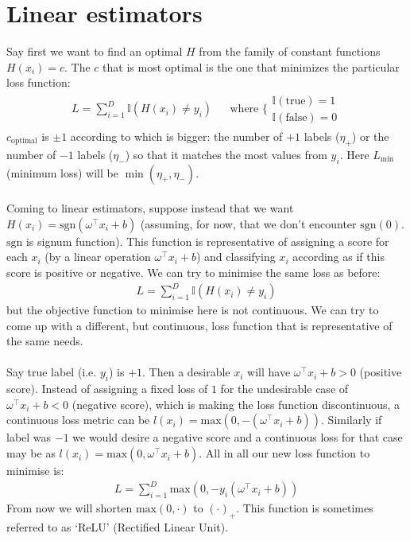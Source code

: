 \documentclass[12pt]{article}
\begin{document}
\section{Linear estimators}
Say first we want to find an optimal $H$ from the family of constant functions $H(x_i) = c$. The $c$ that is most optimal is the one that minimizes the particular loss function:
\begin{align}
    L = \sum_{i=1}^{D}\mathbb{I}\left(H(x_i) \neq y_i\right) && \textrm{where } \bigg\{ \substack{\mathbb{I}(\textrm{true}) = 1 \\ \mathbb{I}(\textrm{false}) = 0}
\end{align}
$c_{\textrm{optimal}}$ is $\pm 1$ according to which is bigger: the number of $+1$ labels ($\eta_+$) or the number of $-1$ labels ($\eta_-$) so that it matches the most values from $y_i$. Here $L_{\textrm{min}}$ (minimum loss) will be $ \min(\eta_+, \eta_-)$.
\\\\
Coming to linear estimators, suppose instead that we want $H(x_i) = \textrm{sgn} (\omega^{\top} x_i + b)$ (assuming, for now, that we don't encounter $\textrm{sgn}(0)$. $\textrm{sgn}$ is signum function). This function is representative of assigning a score for each $x_i$ (by a linear operation $\omega^{\top}x_i + b$) and classifying $x_i$ according as if this score is positive or negative. We can try to minimise the same loss as before:
\begin{align}
    L = \sum_{i=1}^{D}\mathbb{I}\left(H(x_i) \neq y_i\right)
\end{align}
but the objective function to minimise here is not continuous. We can try to come up with a different, but continuous, loss function that is representative of the same needs. 
\\\\
Say true label (i.e. $y_i$) is $+1$. Then a desirable $x_i$ will have $\omega^{\top}x_i + b > 0$ (positive score). Instead of assigning a fixed loss of $1$ for the undesirable case of $\omega^{\top}x_i + b < 0$ (negative score), which is making the loss function discontinuous, a continuous loss metric can be $l(x_i) = \text{max}(0,-(\omega^{\top}x_i + b))$. Similarly if label was $-1$ we would desire a negative score and a continuous loss for that case may be as $l(x_i) = \text{max}(0,\omega^{\top}x_i + b)$. All in all our new loss function to minimise is:
\begin{align}
    L = \sum_{i=1}^{D}\textrm{max}\left(0, -y_i(\omega^{\top}x_i + b)\right)
\end{align}
From now we will shorten $\textrm{max}(0, \cdot)$ to $(\cdot)_+$. This function is sometimes referred to as `ReLU' (Rectified Linear Unit).
\end{document}
